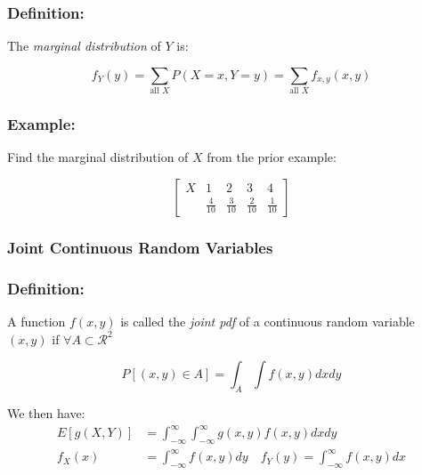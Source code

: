 \documentclass{article}
\begin{document}
\subsubsection*{Definition:}

The \textit{marginal distribution} of $Y$ is:

\begin{equation*}
    f_Y(y) = \sum_{\text{all } X} P(X = x, Y=y) = \sum_{\text{all } X} f_{x,y}(x,y)
\end{equation*}

\subsubsection*{Example:}
Find the marginal distribution of $X$ from the prior example:

\begin{equation*}
    \begin{bmatrix}
        X & 1 & 2 & 3 & 4\\
         & \frac{4}{10} & \frac{3}{10} & \frac{2}{10} & \frac{1}{10}
    \end{bmatrix}
\end{equation*}

\subsubsection{Joint Continuous Random Variables}

\subsubsection*{Definition:}

A function $f(x,y)$ is called the \textit{joint pdf} of a continuous random variable $(x,y)$ if $\forall A \subset \mathcal{R}^2$

\begin{equation*}
    P[(x,y) \in A] = \int_A \int f(x,y) dx dy
\end{equation*}

We then have:
\begin{equation*}
    \begin{split}
        E[g(X,Y)] &= \int_{-\infty}^\infty \int_{-\infty}^\infty g(x,y) f(x,y) dx dy\\
        f_X(x) &= \int_{-\infty}^\infty f(x,y)dy \quad f_Y(y) = \int_{-\infty}^\infty f(x,y) dx
    \end{split}
\end{equation*}
\end{document}
